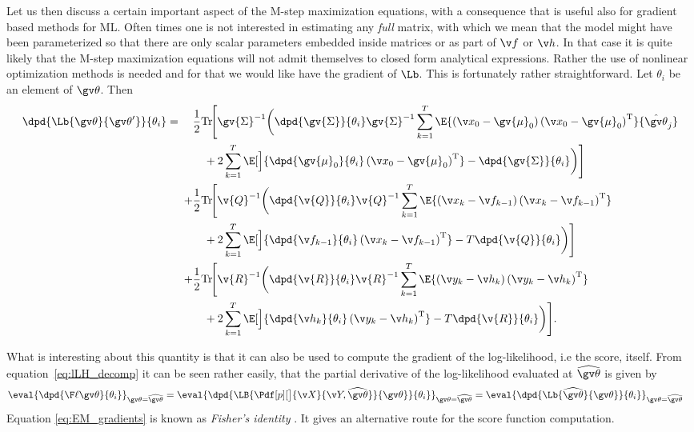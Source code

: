 Let us then discuss a certain important aspect of the M-step maximization equations, with a consequence
that is useful also for gradient based methods for ML. Often times
one is not interested in estimating any \emph{full} matrix, with which we mean that the model
might have been parameterized so that there are only scalar parameters embedded inside matrices or 
as part of $\f$ or $\h$. In that case
it is quite likely that the M-step maximization equations will not admit themselves to closed form
analytical expressions. Rather the use of nonlinear optimization methods is needed and for that
we would like have the gradient of $\Lb$. This is fortunately rather straightforward. Let
$\theta_i$ be an element of $\Th$. Then
\begin{align}
\label{eq:dLB_nonlinear}
\begin{split}
	\dpd{\Lb{\Th}{\Th'}}{\theta_i}
	=\quad{}&\frac{1}{2}\mathrm{Tr}\!\Bigg[\gv{\Sigma}^{-1}\bigg(
	\dpd{\gv{\Sigma}}{\theta_i}\gv{\Sigma}^{-1}
	\sum_{k=1}^T\E{\left(\x_0-\gv{\mu}_0\right)\left(\x_0-\gv{\mu}_0\right)^\tr}{\hat{\Th}_j}\\
%
	&\quad+2\sum_{k=1}^T\E[\Big]{\dpd{\gv{\mu}_0}{\theta_i}\left(\x_0-\gv{\mu}_0\right)^\tr}
	-\dpd{\gv{\Sigma}}{\theta_i}\bigg)\Bigg]\\
	+&\frac{1}{2}\mathrm{Tr}\!\Bigg[\v{Q}^{-1}\bigg(\dpd{\v{Q}}{\theta_i}\v{Q}^{-1}
	\sum_{k=1}^T\E{\left(\x_k-\f_{k-1}\right)\left(\x_k-\f_{k-1}\right)^\tr}\\
%	
	&\quad +2\sum_{k=1}^T\E[\Big]{\dpd{\f_{k-1}}{\theta_i}\left(\x_k-\f_{k-1}\right)^\tr}
	-T\dpd{\v{Q}}{\theta_i}\bigg)\Bigg]\\
	+&\frac{1}{2}\mathrm{Tr}\!\Bigg[\v{R}^{-1}\bigg(\dpd{\v{R}}{\theta_i}\v{R}^{-1}
	\sum_{k=1}^T\E{\left(\y_k-\h_{k}\right)\left(\y_k-\h_{k}\right)^\tr}\\
	&\quad +2\sum_{k=1}^T\E[\Big]{\dpd{\h_{k}}{\theta_i}\left(\y_k-\h_{k}\right)^\tr}
	-T\dpd{\v{R}}{\theta_i}\bigg)\Bigg].
\end{split}	
\end{align}

What is interesting about this quantity is that it can also be used to compute the gradient of the log-likelihood, i.e
the score, itself. From equation~\eqref{eq:lLH_decomp} it can be seen rather easily, that  
the partial derivative of the log-likelihood evaluated at $\widehat{\Th}$ is given by
\begin{align}
		\eval{\dpd{\lLH}{\theta_i}}_{\Th=\widehat\Th}&=
		\eval{\dpd{\LB{\Pdf[p][\big]{\X}{\Y,\widehat\Th}}{\Th}}{\theta_i}}_{\Th=\widehat\Th}=
		\eval{\dpd{ \Lb{\widehat\Th}{\Th}}{\theta_i}}_{\Th=\widehat\Th} \label{eq:EM_gradients}
\end{align} 
Equation \eqref{eq:EM_gradients} is known as \emph{Fisher's identity} \parencite{Cappe2005}. It gives
an alternative route for the score function computation.

